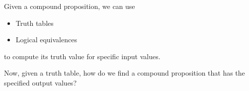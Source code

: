 \newpage
Given a compound proposition, we can use
\begin{itemize}
\item Truth tables
\item Logical equivalences
\end{itemize}
to compute its truth value for specific input values.

Now, given a truth table, how do we find a compound proposition that has the specified output values?
